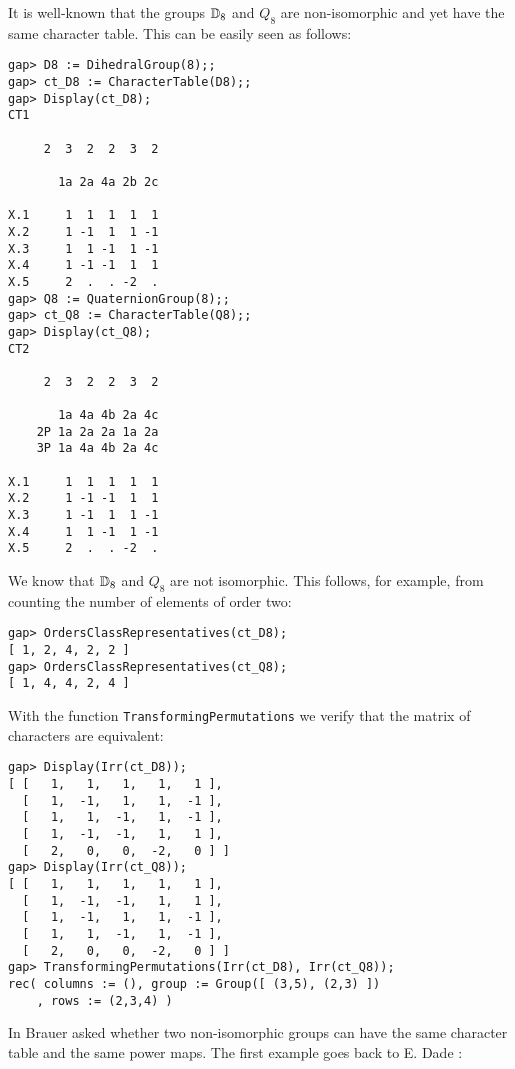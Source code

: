 \begin{example}
    It is well-known that the groups $\mathbb{D}_{8}$ and $Q_8$ 
    are non-isomorphic and yet have the same character table. 
    This can be easily seen as follows:
\begin{lstlisting}
gap> D8 := DihedralGroup(8);;
gap> ct_D8 := CharacterTable(D8);;
gap> Display(ct_D8);
CT1

     2  3  2  2  3  2

       1a 2a 4a 2b 2c

X.1     1  1  1  1  1
X.2     1 -1  1  1 -1
X.3     1  1 -1  1 -1
X.4     1 -1 -1  1  1
X.5     2  .  . -2  .
gap> Q8 := QuaternionGroup(8);;
gap> ct_Q8 := CharacterTable(Q8);;
gap> Display(ct_Q8);
CT2

     2  3  2  2  3  2

       1a 4a 4b 2a 4c
    2P 1a 2a 2a 1a 2a
    3P 1a 4a 4b 2a 4c

X.1     1  1  1  1  1
X.2     1 -1 -1  1  1
X.3     1 -1  1  1 -1
X.4     1  1 -1  1 -1
X.5     2  .  . -2  .
\end{lstlisting}
We know that $\mathbb{D}_{8}$ and $Q_8$ are not isomorphic. This follows, for example, 
from counting the number of elements of order two:
\begin{lstlisting}
gap> OrdersClassRepresentatives(ct_D8);
[ 1, 2, 4, 2, 2 ]
gap> OrdersClassRepresentatives(ct_Q8);
[ 1, 4, 4, 2, 4 ]
\end{lstlisting}
With the function \lstinline{TransformingPermutations} 
we verify that 
the matrix of characters 
are equivalent: 
\begin{lstlisting}
gap> Display(Irr(ct_D8));
[ [   1,   1,   1,   1,   1 ],
  [   1,  -1,   1,   1,  -1 ],
  [   1,   1,  -1,   1,  -1 ],
  [   1,  -1,  -1,   1,   1 ],
  [   2,   0,   0,  -2,   0 ] ]
gap> Display(Irr(ct_Q8));
[ [   1,   1,   1,   1,   1 ],
  [   1,  -1,  -1,   1,   1 ],
  [   1,  -1,   1,   1,  -1 ],
  [   1,   1,  -1,   1,  -1 ],
  [   2,   0,   0,  -2,   0 ] ]
gap> TransformingPermutations(Irr(ct_D8), Irr(ct_Q8));
rec( columns := (), group := Group([ (3,5), (2,3) ])
    , rows := (2,3,4) )
\end{lstlisting}
\end{example}

In \cite{MR0178056} Brauer asked whether two non-isomorphic groups
can have the same character table and the same power maps. The 
first example goes back to E. Dade \cite{MR170957}:

